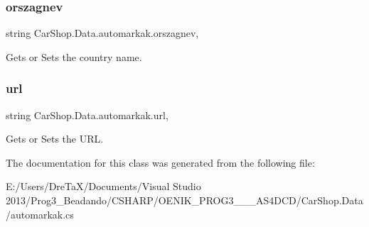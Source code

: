 \subsubsection{\texorpdfstring{orszagnev}{orszagnev}}
{\footnotesize\ttfamily string Car\+Shop.\+Data.\+automarkak.\+orszagnev\hspace{0.3cm}{\ttfamily [get]}, {\ttfamily [set]}}



Gets or Sets the country name. 

\mbox{\label{class_car_shop_1_1_data_1_1automarkak_a532e5b0b45c5f717ad1be50ce28e6af6}} 
\subsubsection{\texorpdfstring{url}{url}}
{\footnotesize\ttfamily string Car\+Shop.\+Data.\+automarkak.\+url\hspace{0.3cm}{\ttfamily [get]}, {\ttfamily [set]}}



Gets or Sets the U\+RL. 



The documentation for this class was generated from the following file\+:\begin{DoxyCompactItemize}
\item 
E\+:/\+Users/\+Dre\+Ta\+X/\+Documents/\+Visual Studio 2013/\+Prog3\+\_\+\+Beadando/\+C\+S\+H\+A\+R\+P/\+O\+E\+N\+I\+K\+\_\+\+P\+R\+O\+G3\+\_\+\_\+\_\+\+A\+S4\+D\+C\+D/\+Car\+Shop.\+Data/automarkak.\+cs\end{DoxyCompactItemize}
